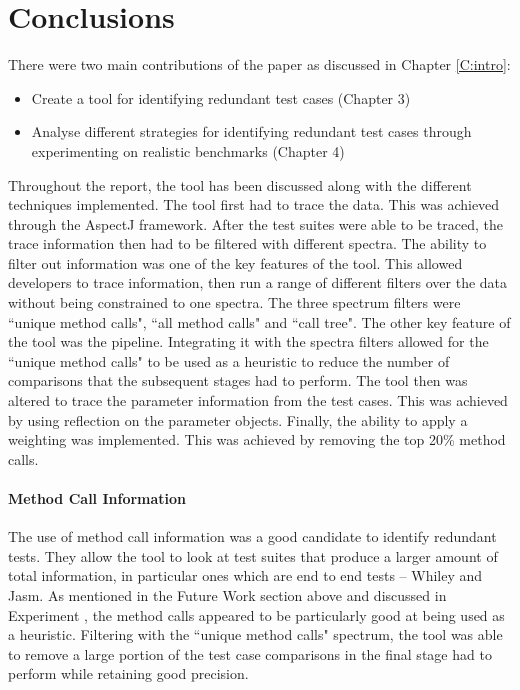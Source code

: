 \section{Conclusions}

There were two main contributions of the paper as discussed in Chapter \ref{C:intro}:

\begin{itemize}
\item Create a tool for identifying redundant test cases (Chapter 3)
\item Analyse different strategies for identifying redundant test cases through experimenting on realistic benchmarks (Chapter 4)
\end{itemize}

Throughout the report, the tool has been discussed along with the different techniques implemented. The tool first had to trace the data. This was achieved through the AspectJ framework. After the test suites were able to be traced, the trace information then had to be filtered with different spectra. The ability to filter out information was one of the key features of the tool. This allowed developers to trace information, then run a range of different filters over the data without being constrained to one spectra. The three spectrum filters were ``unique method calls", ``all method calls" and ``call tree". The other key feature of the tool was the pipeline. Integrating it with the spectra filters allowed for the ``unique method calls" to be used as a heuristic to reduce the number of comparisons that the subsequent stages had to perform. The tool then was altered to trace the parameter information from the test cases. This was achieved by using reflection on the parameter objects. Finally, the ability to apply a weighting was implemented. This was achieved by removing the top 20\% method calls.

\paragraph{Method Call Information}
The use of method call information was a good candidate to identify redundant tests. They allow the tool to look at test suites that produce a larger amount of total information, in particular ones which are end to end tests -- Whiley and Jasm. As mentioned in the Future Work section above and discussed in Experiment , the method calls appeared to be particularly good at being used as a heuristic. Filtering with the ``unique method calls" spectrum, the tool was able to remove a large portion of the test case comparisons in the final stage had to perform while retaining good precision.

